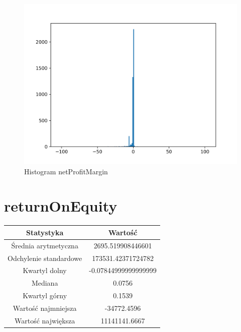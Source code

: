 \documentclass{article}
\begin{document}
\begin{figure}[h!]
    \includegraphics[width=\linewidth]{variables/netProfitMargin.png}
    \caption{Histogram netProfitMargin }
\end{figure}\section{ returnOnEquity }

\begin{center}
    \begin{tabular}{|c | c|} 
    \hline
    Statystyka & Wartość \\
    \hline\hline
    Średnia arytmetyczna & 2695.519908446601 \\ 
    \hline
    Odchylenie standardowe & 173531.42371724782 \\
    \hline
    Kwartyl dolny & -0.07844999999999999 \\
    \hline
    Mediana & 0.0756 \\
    \hline
    Kwartyl górny & 0.1539 \\
    \hline
    Wartość najmniejsza & -34772.4596 \\
    \hline
    Wartość największa & 11141141.6667 \\
    \hline
   \end{tabular}
\end{center}
\end{document}
